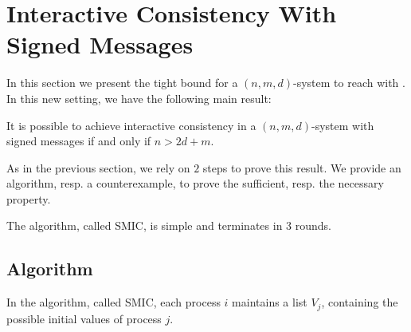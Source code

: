 
\section{Interactive Consistency With Signed Messages}\label{signedMessage}

In this section we present the tight bound for a $( n,m,d )$-system to
reach  with . In this new setting,
we have the following main result:

\begin{theorem}
  \label{consensusSigned} It is possible to achieve  interactive consistency
  in a $( n,m,d )$-system with signed messages  if and only if $n> 2d+m$.
\end{theorem}

As in the previous section, we rely on $2$ steps to prove this result.  We provide an algorithm, resp. a counterexample,  to prove  the sufficient, resp. the necessary property. 

The algorithm, called SMIC, is simple  and terminates in 3 rounds.


\subsection{Algorithm}
In the algorithm, called SMIC, each process $i$ maintains a list $V_{j}$, containing the possible initial values of process $j$.
{}

